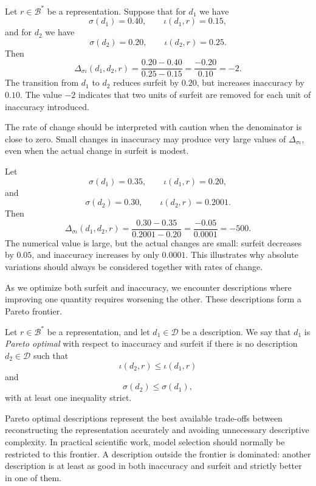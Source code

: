 \begin{example}
Let \(r\in\mathcal B^\ast\) be a representation. Suppose that for \(d_1\) we have
\[
\sigma(d_1)=0.40,
\qquad
\iota(d_1,r)=0.15,
\]
and for \(d_2\) we have
\[
\sigma(d_2)=0.20,
\qquad
\iota(d_2,r)=0.25.
\]
Then
\[
\Delta_{\sigma\iota}(d_1,d_2,r)
=
\frac{0.20-0.40}{0.25-0.15}
=
\frac{-0.20}{0.10}
=
-2.
\]
The transition from \(d_1\) to \(d_2\) reduces surfeit by \(0.20\), but increases inaccuracy by \(0.10\). The value \(-2\) indicates that two units of surfeit are removed for each unit of inaccuracy introduced.
\end{example}

The rate of change should be interpreted with caution when the denominator is close to zero. Small changes in inaccuracy may produce very large values of \(\Delta_{\sigma\iota}\), even when the actual change in surfeit is modest.

\begin{example}
Let
\[
\sigma(d_1)=0.35,
\qquad
\iota(d_1,r)=0.20,
\]
and
\[
\sigma(d_2)=0.30,
\qquad
\iota(d_2,r)=0.2001.
\]
Then
\[
\Delta_{\sigma\iota}(d_1,d_2,r)
=
\frac{0.30-0.35}{0.2001-0.20}
=
\frac{-0.05}{0.0001}
=
-500.
\]
The numerical value is large, but the actual changes are small: surfeit decreases by \(0.05\), and inaccuracy increases by only \(0.0001\). This illustrates why absolute variations should always be considered together with rates of change.
\end{example}

As we optimize both surfeit and inaccuracy, we encounter descriptions where improving one quantity requires worsening the other. These descriptions form a Pareto frontier.

\begin{definition}
Let \(r\in\mathcal B^\ast\) be a representation, and let \(d_1\in\mathcal D\) be a description. We say that \(d_1\) is \emph{Pareto optimal} with respect to inaccuracy and surfeit if there is no description \(d_2\in\mathcal D\) such that
\[
\iota(d_2,r)\leq \iota(d_1,r)
\]
and
\[
\sigma(d_2)\leq \sigma(d_1),
\]
with at least one inequality strict.
\end{definition}

Pareto optimal descriptions represent the best available trade-offs between reconstructing the representation accurately and avoiding unnecessary descriptive complexity. In practical scientific work, model selection should normally be restricted to this frontier. A description outside the frontier is dominated: another description is at least as good in both inaccuracy and surfeit and strictly better in one of them.

